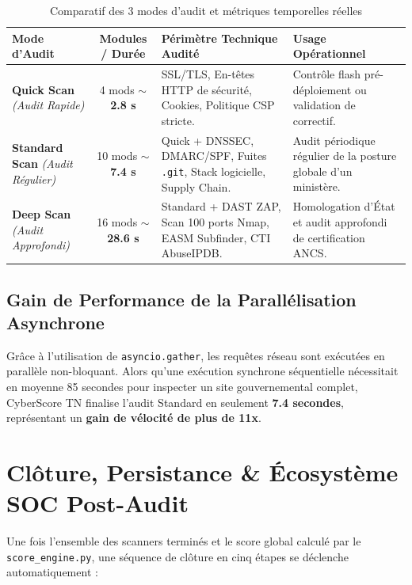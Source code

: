 \begin{table}[!htbp]
\centering
\caption{Comparatif des 3 modes d'audit et métriques temporelles réelles}
\label{tab:modes_scan}
\begin{singlespace}
\footnotesize
\renewcommand{\arraystretch}{1.05}
\begin{tabularx}{\textwidth}{p{2.8cm} c X p{4.8cm}}
\toprule
\textbf{Mode d'Audit} & \textbf{Modules / Durée} & \textbf{Périmètre Technique Audité} & \textbf{Usage Opérationnel} \\
\midrule
\textbf{Quick Scan} \newline \textit{(Audit Rapide)} & 4 mods \newline \textbf{$\sim$ 2.8 s} & SSL/TLS, En-têtes HTTP de sécurité, Cookies, Politique CSP stricte. & Contrôle flash pré-déploiement ou validation de correctif. \\
\midrule
\textbf{Standard Scan} \newline \textit{(Audit Régulier)} & 10 mods \newline \textbf{$\sim$ 7.4 s} & Quick + DNSSEC, DMARC/SPF, Fuites \texttt{.git}, Stack logicielle, Supply Chain. & Audit périodique régulier de la posture globale d'un ministère. \\
\midrule
\textbf{Deep Scan} \newline \textit{(Audit Approfondi)} & 16 mods \newline \textbf{$\sim$ 28.6 s} & Standard + DAST ZAP, Scan 100 ports Nmap, EASM Subfinder, CTI AbuseIPDB. & Homologation d'État et audit approfondi de certification ANCS. \\
\bottomrule
\end{tabularx}
\end{singlespace}
\end{table}

\subsection{Gain de Performance de la Parallélisation Asynchrone}
Grâce à l'utilisation de \texttt{asyncio.gather}, les requêtes réseau sont exécutées en parallèle non-bloquant. Alors qu'une exécution synchrone séquentielle nécessitait en moyenne 85 secondes pour inspecter un site gouvernemental complet, CyberScore TN finalise l'audit Standard en seulement \textbf{7.4 secondes}, représentant un \textbf{gain de vélocité de plus de 11x}.

\section{Clôture, Persistance \& Écosystème SOC Post-Audit}
Une fois l'ensemble des scanners terminés et le score global calculé par le \texttt{score\_engine.py}, une séquence de clôture en cinq étapes se déclenche automatiquement :

